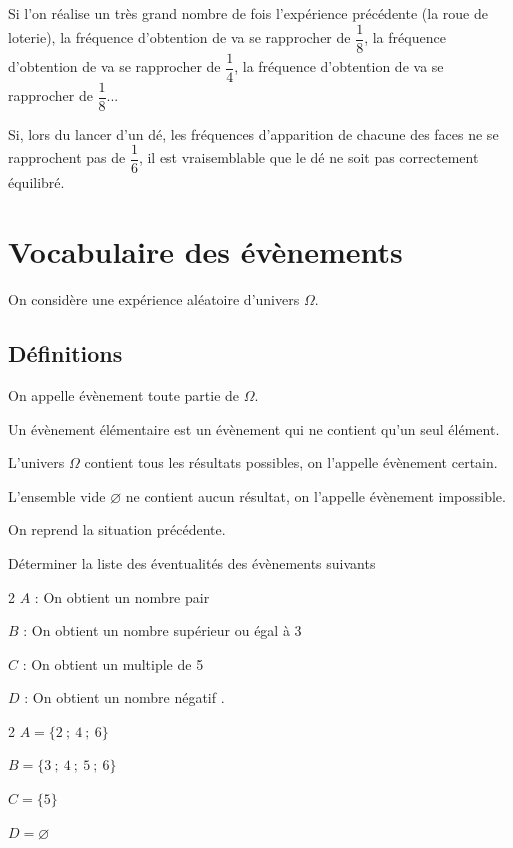 \documentclass[french]{book}
\begin{document}
\begin{exemple}
Si l'on r\'ealise un tr\`es grand nombre de fois l'exp\'erience pr\'ec\'edente (la roue de loterie), la fr\'equence d'obtention de  \fg{} va se rapprocher de $\dfrac{1}{8}$, la fr\'equence d'obtention de  \fg{} va se rapprocher de $\dfrac{1}{4}$, la fr\'equence d'obtention de  \fg{} va se rapprocher de $\dfrac{1}{8}$...

Si, lors du lancer d'un d\'e, les fr\'equences d'apparition de chacune des faces ne se rapprochent pas de $\dfrac{1}{6}$, il est vraisemblable que le d\'e ne soit pas correctement \'equilibr\'e.
\end{exemple}
%
\newpage
\section{Vocabulaire des \'ev\`enements}
On consid\`ere une exp\'erience al\'eatoire d'univers $\Omega$.
\subsection{D\'efinitions}

\begin{defn}
On appelle \'ev\`enement toute partie de $\Omega$.

Un \'ev\`enement \'el\'ementaire est un \'ev\`enement qui ne contient qu'un seul \'el\'ement.

L'univers $\Omega$ contient tous les r\'esultats possibles, on l'appelle \'ev\`enement certain.

L'ensemble vide $\varnothing$ ne contient aucun r\'esultat, on l'appelle \'ev\`enement impossible.
\end{defn}

\begin{exemple}
On reprend la situation pr\'ec\'edente.

D\'eterminer la liste des \'eventualit\'es des \'ev\`enements suivants
\begin{multicols}{2}
$A$ : \og On obtient un nombre pair \fg

$B$ : \og On obtient un nombre sup\'erieur ou \'egal à 3 \fg

$C$ : \og On obtient un multiple de 5 \fg

$D$ : \og On obtient un nombre n\'egatif \fg.
\end{multicols}
\end{exemple}

\begin{multicols}{2}
$A=\{2~;~4~;~6\}$

$B=\{3~;~4~;~5~;~6\}$

$C=\{5\}$

$D=\varnothing$

\end{multicols}
\end{document}
